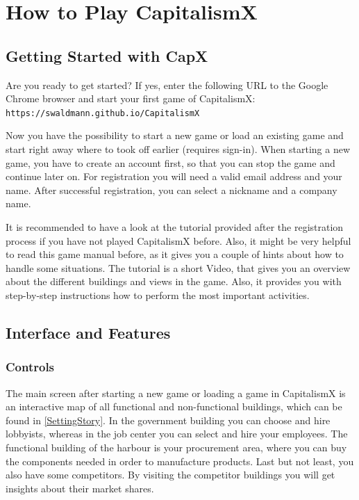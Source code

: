 \documentclass[11pt,titlepage,oneside,openany]{book}
\begin{document}
\chapter{How to Play CapitalismX}

\section{Getting Started with CapX}

Are you ready to get started? If yes, enter the following URL to the Google Chrome browser and start your first game of CapitalismX: \\
\texttt{https://swaldmann.github.io/CapitalismX}

Now you have the possibility to start a new game or load an existing game and start right away where to took off earlier (requires sign-in). When starting a new game, you have to create an account first, so that you can stop the game and continue later on. For registration you will need a valid email address and your name. After successful registration, you can select a nickname and a company name. 

It is recommended to have a look at the tutorial provided after the registration process if you have not played CapitalismX before. Also, it might be very helpful to read this game manual before, as it gives you a couple of hints about how to handle some situations. The tutorial is a short Video, that gives you an overview about the different buildings and views in the game. Also, it provides you with step-by-step instructions how to perform the most important activities.

\section{Interface and Features}

\subsection{Controls}  
The main screen after starting a new game or loading a game in CapitalismX is an interactive map of all functional and non-functional buildings, which can be found in \ref{SettingStory}. In the government building you can choose and hire lobbyists, whereas in the job center you can select and hire your employees. The functional building of the harbour is your procurement area, where you can buy the components needed in order to manufacture products. Last but not least, you also have some competitors. By visiting the competitor buildings you will get insights about their market shares.
\end{document}
